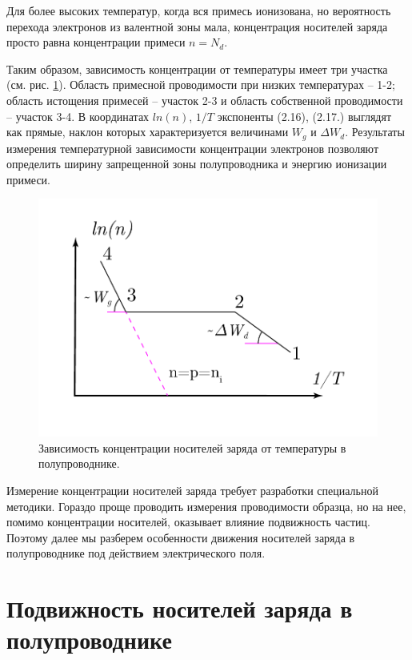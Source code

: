 Для более высоких температур, когда вся примесь ионизована, но вероятность перехода электронов из валентной зоны мала,
концентрация носителей заряда просто равна концентрации примеси $n=N_d$. 


Таким образом, зависимость концентрации от температуры имеет три участка (см. рис. \ref{fig:2.2}). Область примесной проводимости
при низких температурах – 1-2; область истощения примесей – участок 2-3 и область собственной проводимости – участок
3-4. В координатах $ln(n)$, $1/T$ экспоненты (2.16), (2.17.) выглядят как прямые, наклон которых характеризуется величинами
$W_g$ и $\Delta W_d$. Результаты измерения температурной зависимости концентрации электронов позволяют определить ширину
запрещенной зоны полупроводника и энергию ионизации примеси.

\begin{figure}[h!]
	\centering
	\includegraphics[width = .7\linewidth]{img/23}
	\caption{Зависимость концентрации носителей заряда от температуры в полупроводнике.}
	\label{fig:2.2}
\end{figure}

Измерение концентрации носителей заряда требует разработки специальной методики. Гораздо проще проводить измерения
проводимости образца, но на нее, помимо концентрации носителей, оказывает влияние подвижность частиц. Поэтому далее мы
разберем особенности движения носителей заряда в полупроводнике под действием электрического поля. 


\section{Подвижность носителей заряда в полупроводнике}

